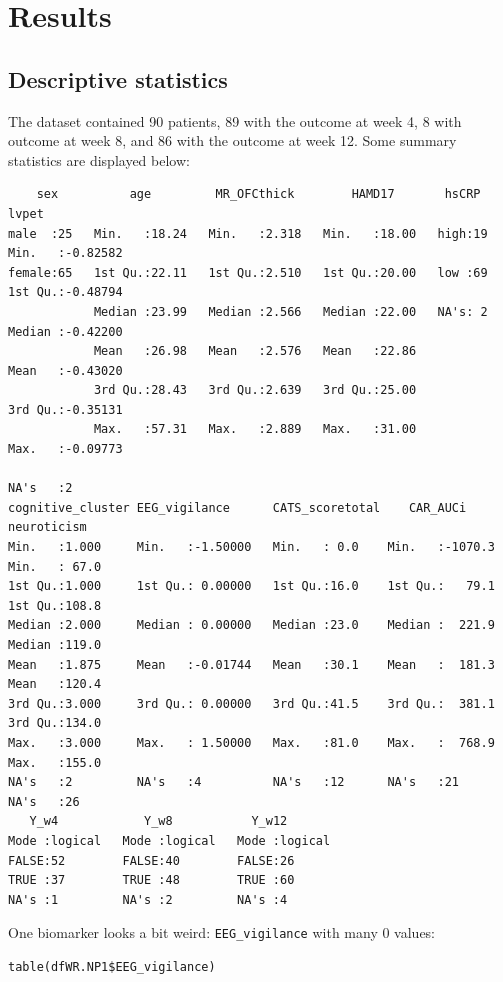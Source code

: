 \documentclass[12pt]{article}
\begin{document}
\bigskip

\clearpage

\section{Results}
\label{sec:orgbe6cecc}


\subsection{Descriptive statistics}
\label{sec:org1d58ed9}

The dataset contained 90 patients, 89 with the outcome at week 4, 8
with outcome at week 8, and 86 with the outcome at week 12. Some
summary statistics are displayed below:
\begin{verbatim}
    sex          age         MR_OFCthick        HAMD17       hsCRP        lvpet         
male  :25   Min.   :18.24   Min.   :2.318   Min.   :18.00   high:19   Min.   :-0.82582  
female:65   1st Qu.:22.11   1st Qu.:2.510   1st Qu.:20.00   low :69   1st Qu.:-0.48794  
            Median :23.99   Median :2.566   Median :22.00   NA's: 2   Median :-0.42200  
            Mean   :26.98   Mean   :2.576   Mean   :22.86             Mean   :-0.43020  
            3rd Qu.:28.43   3rd Qu.:2.639   3rd Qu.:25.00             3rd Qu.:-0.35131  
            Max.   :57.31   Max.   :2.889   Max.   :31.00             Max.   :-0.09773  
                                                                      NA's   :2         
cognitive_cluster EEG_vigilance      CATS_scoretotal    CAR_AUCi        neuroticism   
Min.   :1.000     Min.   :-1.50000   Min.   : 0.0    Min.   :-1070.3   Min.   : 67.0  
1st Qu.:1.000     1st Qu.: 0.00000   1st Qu.:16.0    1st Qu.:   79.1   1st Qu.:108.8  
Median :2.000     Median : 0.00000   Median :23.0    Median :  221.9   Median :119.0  
Mean   :1.875     Mean   :-0.01744   Mean   :30.1    Mean   :  181.3   Mean   :120.4  
3rd Qu.:3.000     3rd Qu.: 0.00000   3rd Qu.:41.5    3rd Qu.:  381.1   3rd Qu.:134.0  
Max.   :3.000     Max.   : 1.50000   Max.   :81.0    Max.   :  768.9   Max.   :155.0  
NA's   :2         NA's   :4          NA's   :12      NA's   :21        NA's   :26     
   Y_w4            Y_w8           Y_w12        
Mode :logical   Mode :logical   Mode :logical  
FALSE:52        FALSE:40        FALSE:26       
TRUE :37        TRUE :48        TRUE :60       
NA's :1         NA's :2         NA's :4
\end{verbatim}

One biomarker looks a bit weird: \texttt{EEG\_vigilance} with many 0 values:
\lstset{language=r,label= ,caption= ,captionpos=b,numbers=none}
\begin{lstlisting}
table(dfWR.NP1$EEG_vigilance)
\end{lstlisting}
\end{document}
